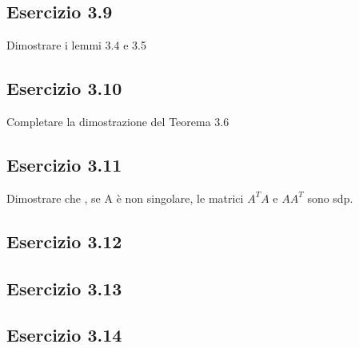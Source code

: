 \subsection{Esercizio 3.9}
Dimostrare i lemmi 3.4 e 3.5
\subsection{Esercizio 3.10}
Completare la dimostrazione del Teorema 3.6
\subsection{Esercizio 3.11}
Dimostrare che , se A è non singolare, le matrici $A^{T}A$ e $AA^{T}$ sono sdp.
\subsection{Esercizio 3.12}

\subsection{Esercizio 3.13}
\subsection{Esercizio 3.14}